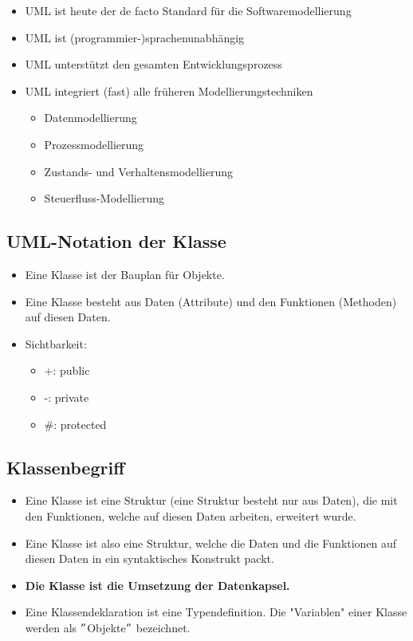 \begin{multicols}{2}
\begin{itemize}
	\item UML ist heute der de facto Standard für die Softwaremodellierung
	\item UML ist (programmier-)sprachenunabhängig
	\item UML unterstützt den gesamten Entwicklungsprozess
	\item UML integriert (fast) alle früheren Modellierungstechniken
	\begin{itemize}
		\item Datenmodellierung
		\item Prozessmodellierung
		\item Zustands- und Verhaltensmodellierung
		\item Steuerfluss-Modellierung
	\end{itemize}
\end{itemize}
\end{multicols}

\subsection{UML-Notation der Klasse}
\begin{itemize}
	\item Eine Klasse ist der Bauplan für Objekte.
	\item Eine Klasse besteht aus Daten (Attribute) und den Funktionen (Methoden) auf diesen Daten.
	\item Sichtbarkeit:
	\begin{itemize}
		\item[\-] +: public
		\item[\-] -: private
		\item[\-] \#: protected
	\end{itemize}
\end{itemize}

\subsection{Klassenbegriff}
\begin{itemize}
	\item Eine Klasse ist eine Struktur (eine Struktur besteht nur aus Daten), die mit den Funktionen, welche auf diesen Daten arbeiten, erweitert wurde.
	\item Eine Klasse ist also eine Struktur, welche die Daten und die Funktionen auf diesen Daten in ein syntaktisches Konstrukt packt.
	\item \textbf{Die Klasse ist die Umsetzung der Datenkapsel.}
	\item Eine Klassendeklaration ist eine Typendefinition. Die "Variablen" einer Klasse werden als $"$Objekte$"$ bezeichnet.
\end{itemize}

